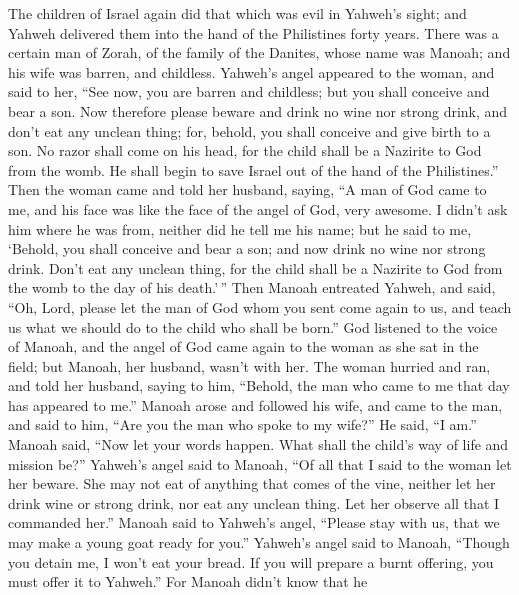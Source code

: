 \begin{paracol}{2}
\begin{otherlanguage}{english}
 The children of Israel again did that which was evil in
Yahweh's sight; and Yahweh delivered them into the hand of the
Philistines forty years.  There was a certain man of
Zorah, of the family of the Danites, whose name was Manoah; and his wife
was barren, and childless.  Yahweh's angel appeared to the
woman, and said to her, ``See now, you are barren and childless; but you
shall conceive and bear a son.  Now therefore please
beware and drink no wine nor strong drink, and don't eat any unclean
thing;  for, behold, you shall conceive and give birth to
a son. No razor shall come on his head, for the child shall be a
Nazirite to God from the womb. He shall begin to save Israel out of the
hand of the Philistines.''  Then the woman came and told
her husband, saying, ``A man of God came to me, and his face was like
the face of the angel of God, very awesome. I didn't ask him where he
was from, neither did he tell me his name;  but he said to
me, `Behold, you shall conceive and bear a son; and now drink no wine
nor strong drink. Don't eat any unclean thing, for the child shall be a
Nazirite to God from the womb to the day of his death.'\,''
 Then Manoah entreated Yahweh, and said, ``Oh, Lord,
please let the man of God whom you sent come again to us, and teach us
what we should do to the child who shall be born.''  God
listened to the voice of Manoah, and the angel of God came again to the
woman as she sat in the field; but Manoah, her husband, wasn't with her.
 The woman hurried and ran, and told her husband, saying
to him, ``Behold, the man who came to me that day has appeared to me.''
 Manoah arose and followed his wife, and came to the man,
and said to him, ``Are you the man who spoke to my wife?'' He said, ``I
am.''  Manoah said, ``Now let your words happen. What
shall the child's way of life and mission be?''  Yahweh's
angel said to Manoah, ``Of all that I said to the woman let her beware.
 She may not eat of anything that comes of the vine,
neither let her drink wine or strong drink, nor eat any unclean thing.
Let her observe all that I commanded her.''  Manoah said
to Yahweh's angel, ``Please stay with us, that we may make a young goat
ready for you.''  Yahweh's angel said to Manoah, ``Though
you detain me, I won't eat your bread. If you will prepare a burnt
offering, you must offer it to Yahweh.'' For Manoah didn't know that he

\end{otherlanguage}
\end{paracol}
